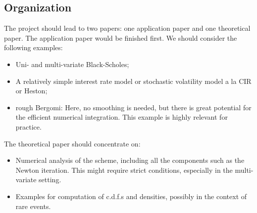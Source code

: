 \documentclass[11pt]{article}
\begin{document}
\subsection{Organization}
\label{sec:organization}

The project should lead to two papers: one application paper and one
theoretical paper. The application paper would be finished first. We should
consider the following examples:
\begin{itemize}
\item Uni- and multi-variate Black-Scholes;
\item A relatively simple interest rate model or stochastic volatility model a
  la CIR or Heston;
\item rough Bergomi: Here, no smoothing is needed, but there is great
  potential for the efficient numerical integration. This example is highly
  relevant for practice.
\end{itemize}

The theoretical paper should concentrate on:
\begin{itemize}
\item Numerical analysis of the scheme, including all the components such as
  the Newton iteration. This might require strict conditions, especially in
  the multi-variate setting.
\item Examples for computation of c.d.f.s and densities, possibly in the
  context of rare events.
\end{itemize}
\end{document}
